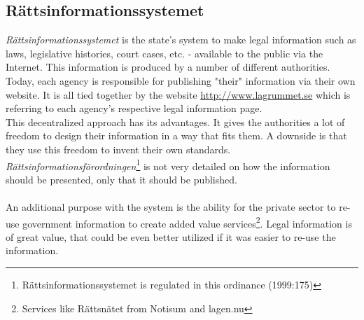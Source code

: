 \subsection{Rättsinformationssystemet}
\textit{Rättsinformationssystemet} is the state's system to make legal information such as laws, legislative histories, court cases, etc. - available to the public via the Internet. This information is produced by a number of different authorities. Today, each agency is responsible for publishing "their" information via their own website. It is all tied together by the website \url{http://www.lagrummet.se} which is referring to each agency's respective legal information page.\\
This decentralized approach has its advantages. It gives the authorities a lot of freedom to design their information in a way that fits them. A downside is that they use this freedom to invent their own standards. \textit{Rättsinformationsförordningen}\footnote{Rättsinformationssystemet is regulated in this ordinance (1999:175)} is not very detailed on how the information should be presented, only that it should be published.\\\\
An additional purpose with the system is the ability for the private sector to re-use government information to create added value services\footnote{Services like Rättsnätet from Notisum and lagen.nu}. Legal information is of great value, that could be even better utilized if it was easier to re-use the information.
